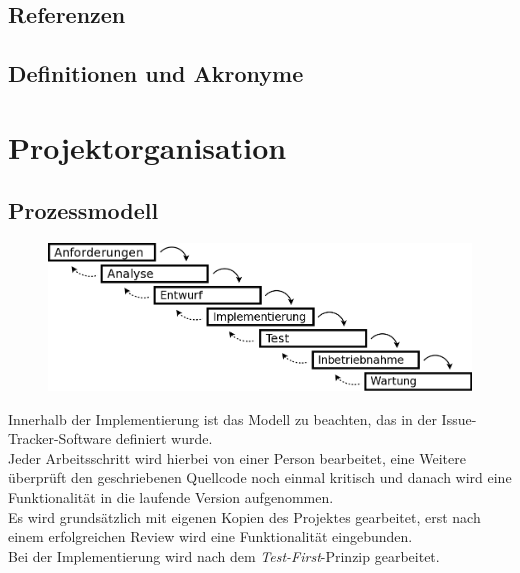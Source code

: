 \documentclass[fontsize=12pt,paper=a4,twoside]{scrartcl}
\begin{document}
\subsection{Referenzen}
%
%
%
%

{\renewcommand\section[2]{}

}

\subsection{Definitionen und Akronyme}


\section{Projektorganisation}

\subsection{Prozessmodell}
  \begin{figure}[H]
  	\centering
  	\includegraphics[width=1\textwidth]{../modell.png}
  \end{figure}
  
  Innerhalb der Implementierung ist das Modell zu beachten, das in der Issue-Tracker-Software definiert wurde.\\
  Jeder Arbeitsschritt wird hierbei von einer Person bearbeitet, eine Weitere überprüft den geschriebenen Quellcode noch einmal kritisch und danach wird eine Funktionalität in die laufende Version aufgenommen.\\
  Es wird grundsätzlich mit eigenen Kopien des Projektes gearbeitet, erst nach einem erfolgreichen Review wird eine Funktionalität eingebunden.
  \\[1\baselineskip]
  Bei der Implementierung wird nach dem \textit{Test-First}-Prinzip gearbeitet.
  
\end{document}

